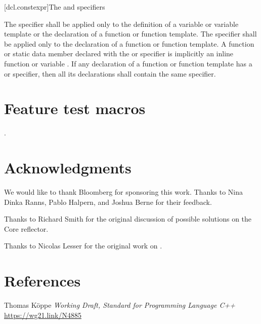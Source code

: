 \documentclass{wg21}
\begin{document}
[dcl.constexpr]{The  and  specifiers}%

\pnum
The  specifier shall be applied only to
the definition of a variable or variable template or
the declaration of a function or function template.
The  specifier shall be applied only to
the declaration of a function or function template.
A function or static data member
declared with the  or  specifier
is implicitly an inline function or variable .
If any declaration of a function or function template has
a  or  specifier,
then all its declarations shall contain the same specifier.


\section{Feature test macros}

.


\section{Acknowledgments}

We would like to thank Bloomberg for sponsoring this work.
Thanks to Nina Dinka Ranns, Pablo Halpern, and Joshua Berne for their feedback.

Thanks to Richard Smith for the original discussion of possible solutions on the Core reflector.

Thanks to Nicolas Lesser for the original work on .

\section{References}

\renewcommand{\section}[2]{}%



\begin{thebibliography}{9}

Thomas Köppe
\emph{Working Draft, Standard for Programming Language C++}\newline
\url{https://wg21.link/N4885}


\end{thebibliography}
\end{document}

